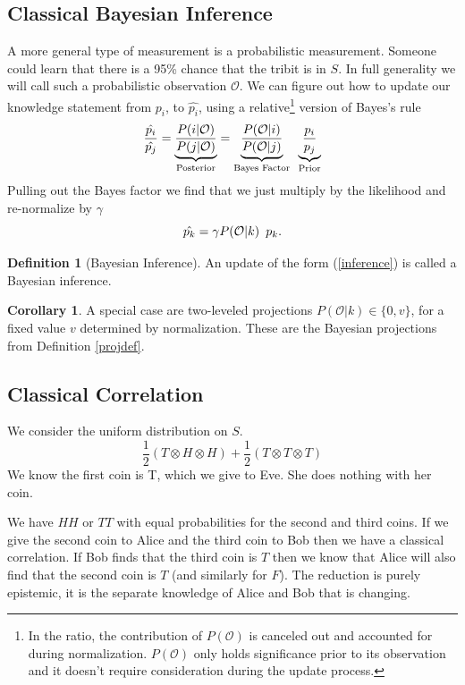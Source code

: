 \documentclass[12pt,a4paper]{article}
\theoremstyle{myrule}
\theoremstyle{postulate}
\theoremstyle{definition}
\newtheorem{definition}{Definition}[section]
\newtheorem{corollary}{Corollary}[theorem]
\begin{document}
\subsection{Classical Bayesian Inference}
A more general type of measurement is a probabilistic measurement.  Someone could learn that there is a 95\% chance that the tribit is in $S$.  In full generality we will call such a probabilistic observation $\mathcal{O}$.  We can figure out how to update our knowledge statement from $p_i$, to $\hat{p_i}$, using a relative\footnote{In the ratio, the contribution of $P(\mathcal{O})$ is canceled out and accounted for during normalization.  $P(\mathcal{O})$ only holds significance prior to its observation and it doesn't require consideration during the update process.} version of Bayes's rule
\[
  \frac{\hat{p_i}}{\hat{p_j}} = \underbrace{\frac{P(i | \mathcal{O})}{P(j | \mathcal{O})}}_\text{Posterior}
                              = \underbrace{\frac{P(\mathcal{O} | i)}{P(\mathcal{O}|j)}}_\text{Bayes Factor}  \hspace{0.07 in}  \underbrace{\frac{p_i}{p_j}}_\text{Prior}
\]
Pulling out the Bayes factor we find that we just multiply by the likelihood and re-normalize by $\gamma$
\begin{equation}
\label{inference}
  \hat{p_k} =  \gamma P(\mathcal{O} | k) \hspace{0.07 in} p_k.
\end{equation}
\begin{definition}[Bayesian Inference]
\label{infdef}
  An update of the form (\ref{inference}) is called a Bayesian inference.
\end{definition}
\begin{corollary}
A special case are two-leveled projections $P(\mathcal{O} | k) \in \{0,v\}$, for a fixed value $v$ determined by normalization.  These are the Bayesian projections from Definition \ref{projdef}.
\end{corollary}

\subsection{Classical Correlation}
We consider the uniform distribution on $S$.
\[
\frac{1}{2}(T \otimes H \otimes H) + \frac{1}{2}(T \otimes T \otimes T)
\]
We know the first coin is T, which we give to Eve.  She does nothing with her coin.

We have $HH$ or $TT$ with equal probabilities for the second and third coins.  If we give the second coin to Alice and the third coin to Bob then we have a classical correlation.  If Bob finds that the third coin is $T$ then we know that Alice will also find that the second coin is $T$ (and similarly for $F$).  The reduction is purely epistemic, it is the separate knowledge of Alice and Bob that is changing.
\end{document}

